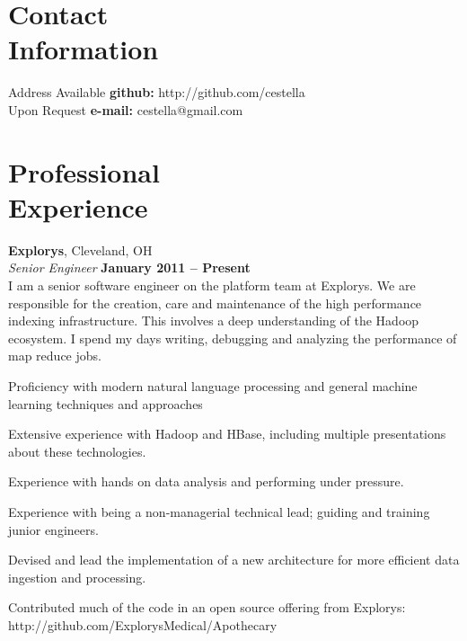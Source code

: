 \documentclass[margin,line,12pt]{resume}
\begin{document}
\begin{resume}
    \thispagestyle{empty}
    \section{\mysidestyle Contact\\Information}

    Address Available             \hfill {\bf github:} http://github.com/cestella \vspace{0mm}\\\vspace{0mm}%
    Upon Request                  \hfill {\bf e-mail:} cestella@gmail.com       \vspace{0mm}\\\vspace{-4.5mm}%

    \section{\mysidestyle Professional\\Experience}

    \textbf{Explorys}, Cleveland, OH \vspace{2mm}\\\vspace{1mm}%
    \textsl{Senior Engineer} \hfill \textbf{January 2011 -- Present}\\
    I am a senior software engineer on the platform team at Explorys. We are responsible for the creation, care and
maintenance of the high performance indexing infrastructure.  This involves a deep understanding
of the Hadoop ecosystem.  I spend my days writing, debugging and analyzing the performance of map reduce jobs.

    \begin{list2}
    \item Proficiency with modern natural language processing and general machine learning techniques and approaches
    \item Extensive experience with Hadoop and HBase, including multiple presentations about these technologies.
    \item Experience with hands on data analysis and performing under pressure.
    \item Experience with being a non-managerial technical lead; guiding and training junior engineers.
    \item Devised and lead the implementation of a new architecture for more efficient data ingestion and processing.
    \item Contributed much of the code in an open source offering from Explorys: http://github.com/ExplorysMedical/Apothecary
    \end{list2}


\end{resume}
\end{document}
